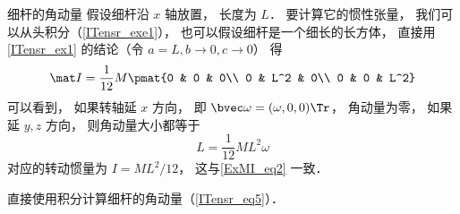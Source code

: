 \begin{example}{细杆的角动量}
假设细杆沿 $x$ 轴放置， 长度为 $L$． 要计算它的惯性张量， 我们可以从头积分（\autoref{ITensr_exe1}）， 也可以假设细杆是一个细长的长方体， 直接用\autoref{ITensr_ex1} 的结论（令 $a = L, b \to 0, c \to 0$） 得
\begin{equation}\label{ITensr_eq5}
\mat I = \frac{1}{12} M \pmat{0 & 0 & 0\\ 0 & L^2 & 0\\ 0 & 0 & L^2}
\end{equation}
可以看到， 如果转轴延 $x$ 方向， 即 $\bvec\omega = (\omega, 0, 0)\Tr$， 角动量为零， 如果延 $y, z$ 方向， 则角动量大小都等于
\begin{equation}
L = \frac{1}{12} M L^2 \omega
\end{equation}
对应的转动惯量为 $I = ML^2/12$， 这与\autoref{ExMI_eq2} 一致．
\end{example}

\begin{exercise}{}\label{ITensr_exe1}
直接使用积分计算细杆的角动量（\autoref{ITensr_eq5}）．
\end{exercise}

